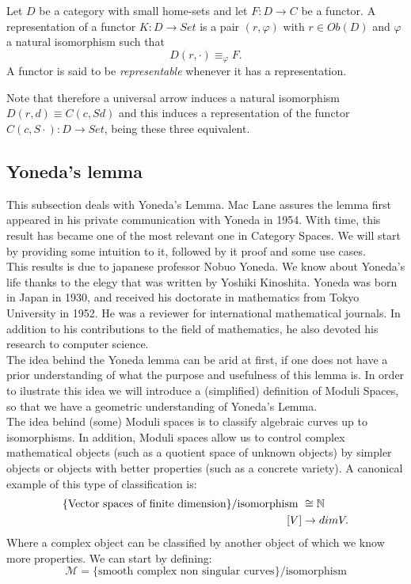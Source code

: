 \begin{definition}
  Let $D$ be a category with small home-sets and let $F:D\to C$ be a functor. A representation of a functor $K:D\to Set$ is a pair $(r,\varphi)$ with $r \in Ob(D)$ and $ \varphi$ a natural isomorphism  such that
  $$D(r,\cdot) \equiv_{\varphi} F.$$
  A functor is said to be \emph{representable} whenever it has a representation.
\end{definition}

Note that therefore a universal arrow induces a natural isomorphism $D(r,d)\equiv C(c,Sd)$ and this induces a representation of the functor $C(c,S\cdot): D\to Set$, being these three equivalent.

\subsection{Yoneda's lemma}
This subsection  deals with Yoneda's Lemma. Mac Lane\cite{mac2013categories} assures the lemma first appeared in his private communication with Yoneda in 1954. With time, this result has became one of the most relevant one in Category Spaces. We will start by providing some intuition to it, followed by it proof and some use cases.\\


 This results is due to japanese professor Nobuo Yoneda. We know about Yoneda's life thanks to the elegy that was written by Yoshiki Kinoshita\cite{YonedaLife}. Yoneda was born in Japan in 1930, and received his doctorate in mathematics from Tokyo University in 1952. He was a reviewer for international mathematical journals. In addition to his contributions to the field of mathematics, he also devoted his research to computer science.\\


The idea behind the Yoneda lemma can be arid at first, if one does not have a prior understanding of what the purpose and usefulness of this lemma is. In order to ilustrate this idea we will introduce a (simplified) definition of Moduli Spaces, so that we have a geometric understanding of Yoneda's Lemma.\\

The idea behind (some) Moduli spaces is to classify algebraic curves up to isomorphisms. In addition, Moduli spaces allow us to control complex mathematical objects (such as a quotient space of unknown objects) by simpler objects or objects with better properties (such as a concrete variety). A canonical example of this type of classification is:  
\begin{align*}
  \{\text{Vector spaces of finite dimension}\}/\text{isomorphism } &\cong \mathbb{N}\\
  [V] &\to dim V.
\end{align*}
Where a complex object can be classified by another object of which we know more properties. We can start by defining:  
$$\mathcal{M} = \{\text{smooth complex non singular curves} \}/\text{isomorphism}$$

